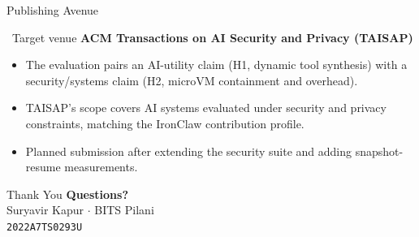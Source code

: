 \documentclass[aspectratio=169,11pt]{beamer}
\begin{document}
\begin{frame}{Publishing Avenue}
  \begin{exampleblock}{\faBullseye\ Target venue}
    \textbf{ACM Transactions on AI Security and Privacy (TAISAP)}
  \end{exampleblock}
  \vspace{0.3cm}
  \footnotesize
  \begin{itemize}
    \item The evaluation pairs an AI-utility claim (H1, dynamic tool
      synthesis) with a security/systems claim (H2, microVM containment and
      overhead).
    \item TAISAP's scope covers AI systems evaluated under security and
      privacy constraints, matching the IronClaw contribution profile.
    \item Planned submission after extending the security suite and adding
      snapshot-resume measurements.
  \end{itemize}
\end{frame}

\begin{frame}{Thank You}
  \centering
  \Huge\textbf{Questions?}\\[0.6cm]
  \large\color{IronGray} Suryavir Kapur \(\cdot\) BITS Pilani\\
  \texttt{2022A7TS0293U}
\end{frame}
\end{document}
